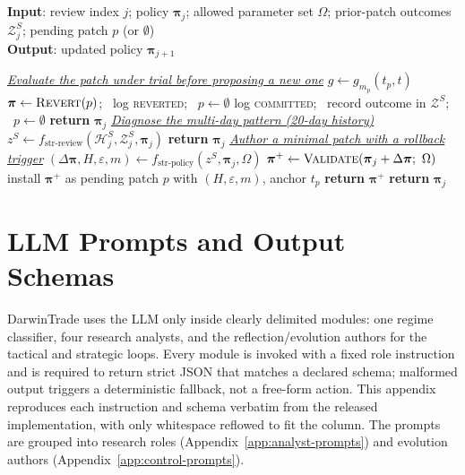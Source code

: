\documentclass[letterpaper]{article}
\newcommand{\PHASE}[1]{\STATE \textit{\underline{#1}}}
\begin{document}
\begin{algorithm}[tb]
\caption{DarwinTrade periodic strategic review (every $N{=}3$ episodes)}
\label{alg:strategic}
\textbf{Input}: review index $j$; policy $\boldsymbol{\pi}_j$; allowed parameter set
$\Omega$; prior-patch outcomes $\mathcal{Z}^S_j$; pending patch $p$ (or $\emptyset$)\\
\textbf{Output}: updated policy $\boldsymbol{\pi}_{j+1}$
\begin{algorithmic}[1]
\PHASE{Evaluate the patch under trial before proposing a new one}
  \STATE $g \leftarrow g_{m_p}(t_p, t)$ 
    \STATE $\boldsymbol{\pi} \leftarrow \textsc{Revert}(p)$; \ log \textsc{reverted}; \ $p \leftarrow \emptyset$
    \STATE log \textsc{committed}; \ record outcome in $\mathcal{Z}^S$; \ $p \leftarrow \emptyset$
  \ELSE
    \STATE \textbf{return} $\boldsymbol{\pi}_j$ 
  \ENDIF
\ENDIF
\PHASE{Diagnose the multi-day pattern (20-day history)}
\STATE $z^S \leftarrow f_{\text{str-review}}(\mathcal{H}^S_j, \mathcal{Z}^S_j, \boldsymbol{\pi}_j)$
  \STATE \textbf{return} $\boldsymbol{\pi}_j$ 
\ENDIF
\PHASE{Author a minimal patch with a rollback trigger}
\STATE $(\Delta\boldsymbol{\pi}, H, \varepsilon, m) \leftarrow f_{\text{str-policy}}(z^S, \boldsymbol{\pi}_j, \Omega)$
\STATE $\boldsymbol{\pi}^{+} \leftarrow \textsc{Validate}(\boldsymbol{\pi}_j + \Delta\boldsymbol{\pi};\ \Omega)$ 
  \STATE install $\boldsymbol{\pi}^{+}$ as pending patch $p$ with $(H, \varepsilon, m)$, anchor $t_p$
  \STATE \textbf{return} $\boldsymbol{\pi}^{+}$
\ENDIF
\STATE \textbf{return} $\boldsymbol{\pi}_j$
\end{algorithmic}
\end{algorithm}

\section{LLM Prompts and Output Schemas}
\label{app:prompts}

DarwinTrade uses the LLM only inside clearly delimited modules: one regime
classifier, four research analysts, and the reflection/evolution authors for the
tactical and strategic loops. Every module is invoked with a fixed role
instruction and is required to return strict JSON that matches a declared schema;
malformed output triggers a deterministic fallback, not a free-form action.
This appendix reproduces each instruction and schema verbatim from the released
implementation, with only whitespace reflowed to fit the column. The prompts are
grouped into research roles (Appendix~\ref{app:analyst-prompts}) and evolution
authors (Appendix~\ref{app:control-prompts}).
\end{document}
